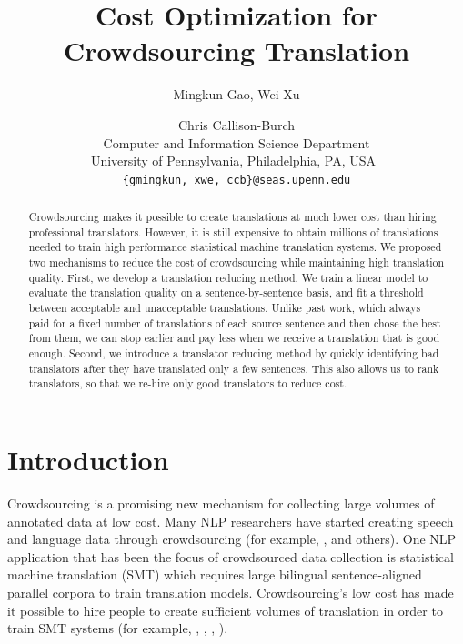 \documentclass[11pt,letterpaper]{article}
\title{Cost Optimization for Crowdsourcing Translation}
\author{Mingkun Gao, Wei Xu \and Chris Callison-Burch\\
  Computer and Information Science Department\\
  University of Pennsylvania, Philadelphia, PA, USA\ \\
  {\tt \{gmingkun, xwe, ccb\}@seas.upenn.edu}
}
\date{}
\begin{document}
\maketitle
\begin{abstract}
Crowdsourcing makes it possible to create translations at much lower cost than hiring professional translators. However, it is still expensive to obtain millions of translations needed to train high performance statistical machine translation systems. We proposed two mechanisms to reduce the cost of crowdsourcing while maintaining high translation quality.
First, we develop a translation reducing method. We train a linear model to evaluate the translation quality on a sentence-by-sentence basis, and fit a threshold between acceptable and unacceptable translations. Unlike past work, which always paid for a fixed number of translations of each source sentence and then chose the best from them, we can stop earlier and pay less when we receive a translation that is good enough. Second, we introduce a translator reducing method by quickly identifying bad translators after they have translated only a few sentences. This also allows us to rank translators, so that we re-hire only good translators to reduce cost.   


 \end{abstract}

\section{Introduction}

Crowdsourcing is a promising new mechanism for collecting large volumes of annotated data at low cost.  %
Many NLP researchers have started creating speech and language data through crowdsourcing (for example,  ,  and others).  One NLP application that has been the focus of crowdsourced data collection is statistical machine translation (SMT) which requires large bilingual sentence-aligned parallel corpora to train translation models.  Crowdsourcing's low cost has made it possible to hire people to create sufficient volumes of translation in order to train SMT systems (for example,  , ,  ,  ).
\end{document}
